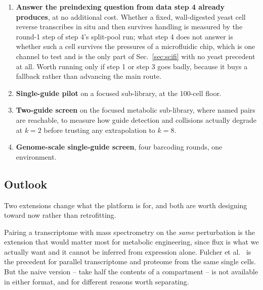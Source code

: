 \begin{enumerate}[leftmargin=1.4em,itemsep=2pt,topsep=2pt]
    success.
  \item \textbf{Answer the preindexing question from data step 4 already
    produces}, at no additional cost. Whether a fixed, wall-digested yeast cell
    reverse transcribes in situ and then survives handling is measured by the
    round-1 step of step 4's split-pool run; what step 4 does not answer is whether
    such a cell survives the pressures of a microfluidic chip, which is one
    channel to test and is the only part of Sec.~\ref{sec:scifi} with no yeast
    precedent at all. Worth running only if step 1 or step 3 goes badly, because
    it buys a fallback rather than advancing the main route.
  \item \textbf{Single-guide pilot} on a focused sub-library, at the 100-cell
    floor.
  \item \textbf{Two-guide screen} on the focused metabolic sub-library, where
    named pairs are reachable, to measure how guide detection and collisions
    actually degrade at $k=2$ before trusting any extrapolation to $k=8$.
  \item \textbf{Genome-scale single-guide screen}, four barcoding rounds, one
    environment.
\end{enumerate}

\subsection{Outlook}
\label{sec:vision}


Two extensions change what the platform is for, and both are worth designing
toward now rather than retrofitting.

Pairing a transcriptome with mass spectrometry on the \emph{same} perturbation is
the extension that would matter most for metabolic engineering, since flux is what
we actually want and it cannot be inferred from expression alone.
Fulcher et al.\ \citep{fulcherParallelMeasurementTranscriptomes2024} is the precedent for parallel
transcriptome and proteome from the same single cells. But the naive version -- take
half the contents of a compartment -- is not available in either format, and for
different reasons worth separating.

